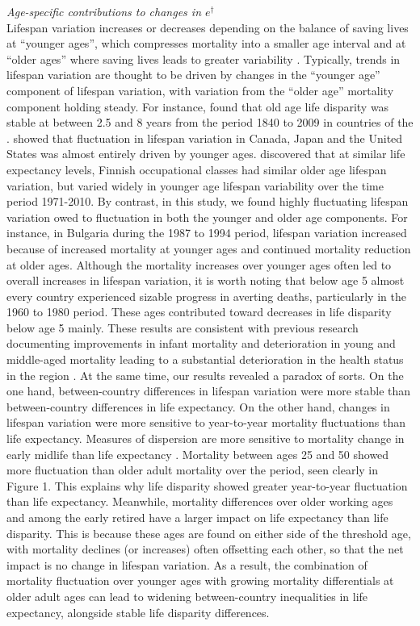 \documentclass{article}
\begin{document}
\begin{spacing}{1.5}
\emph{Age-specific contributions to changes in $e^\dagger$}\\

Lifespan variation increases or decreases depending on the balance of saving lives at ``younger ages'', which compresses mortality into a smaller age interval and at ``older ages'' where saving lives leads to greater variability \citep{zhang2009, gillespie2014divergence,vanraalte2013}. Typically, trends in lifespan variation are thought to be driven by changes in the ``younger age'' component of lifespan variation, with variation from the ``older age'' mortality component holding steady. For instance, \citet{vaupel2011} found that old age life disparity was stable at between 2.5 and 8 years from the period 1840 to 2009 in countries of the \cite{HMD}. \citet{gillespie2014divergence} showed that fluctuation in lifespan variation in Canada, Japan and the United States was almost entirely driven by younger ages. \citet{vanraalte2014} discovered that at similar life expectancy levels, Finnish occupational classes had similar older age lifespan variation, but varied widely in younger age lifespan variability over the time period 1971-2010.  By contrast, in this study, we found highly fluctuating lifespan variation owed to fluctuation in both the younger and older age components. For instance, in Bulgaria during the 1987 to 1994 period, lifespan variation increased because of increased mortality at younger ages and continued mortality reduction at older ages. 
Although the mortality increases over younger ages often led to overall increases in lifespan variation, it is worth noting that below age 5 almost every country experienced sizable progress in averting deaths, particularly in the 1960 to 1980 period. These ages contributed toward decreases in life disparity below age 5 mainly. These results are consistent with previous research documenting improvements in infant mortality and deterioration in young and middle-aged mortality leading to a substantial deterioration in 
the health status in the region \citep{chenet1996}. 
At the same time, our results revealed a paradox of sorts. On the one hand, between-country diﬀerences in lifespan variation were more stable than between-country diﬀerences in life expectancy. On the other hand, changes in lifespan variation were more sensitive to year-to-year mortality ﬂuctuations than life expectancy. Measures of dispersion are more sensitive to mortality change in early midlife than life expectancy \citep{vanraalte2013}. Mortality between ages 25 and 50 showed more fluctuation than older adult mortality over the period, seen clearly in Figure 1. This explains why life disparity showed greater year-to-year fluctuation than life expectancy. Meanwhile, mortality differences over older working ages and among the early retired have a larger impact on life expectancy than life disparity. This is because these ages are found on either side of the threshold age, with mortality declines (or increases) often offsetting each other, so that the net impact is no change in lifespan variation. As a result, the combination of mortality fluctuation over younger ages with growing mortality differentials at older adult ages can lead to widening between-country inequalities in life expectancy, alongside stable life disparity differences.

\end{spacing}
\end{document}
